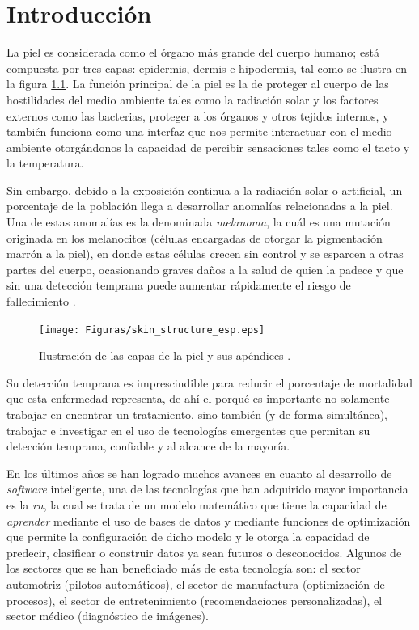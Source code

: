 
\doublespacing


\chapter{Introducción}

La piel es considerada como el órgano más grande del cuerpo humano; está compuesta por tres capas: epidermis, dermis e hipodermis, tal como se ilustra en la figura \ref{fig:skin1_jpg}. La función principal de la piel es la de proteger al cuerpo de las hostilidades del medio ambiente tales como la radiación solar y los factores externos como las bacterias, proteger a los órganos y otros tejidos internos, y también funciona como una interfaz que nos permite interactuar con el medio ambiente otorgándonos la capacidad de percibir sensaciones tales como el tacto y la temperatura.

Sin embargo, debido a la exposición continua a la radiación solar o artificial, un porcentaje de la población llega a desarrollar anomalías relacionadas a la piel. Una de estas anomalías es la denominada \emph{melanoma}, la cuál es una mutación originada en los melanocitos (células encargadas de otorgar la pigmentación marrón a la piel), en donde estas células crecen sin control y se esparcen a otras partes del cuerpo, ocasionando graves daños a la salud de quien la padece y que sin una detección temprana puede aumentar rápidamente el riesgo de fallecimiento \citep{cancer_org}.

\begin{figure}[b!]
    \texttt{[image: Figuras/skin\_structure\_esp.eps]}
    \centering
    \caption{Ilustración de las capas de la piel y sus apéndices \citep{skin_1}.}
    \label{fig:skin1_jpg}
\end{figure}

 Su detección temprana es imprescindible para reducir el porcentaje de mortalidad que esta enfermedad representa, de ahí el porqué es importante no solamente trabajar en encontrar un tratamiento, sino también (y de forma simultánea), trabajar e investigar en el uso de tecnologías emergentes que permitan su detección temprana, confiable y al alcance de la mayoría.

En los últimos años se han logrado muchos avances en cuanto al desarrollo de \emph{software} inteligente, una de las tecnologías que han adquirido mayor importancia es la \emph{\gls{rn}}, la cual se trata de un modelo matemático que tiene la capacidad de \emph{aprender} mediante el uso de bases de datos y mediante funciones de optimización que permite la configuración de dicho modelo y le otorga la capacidad de predecir, clasificar o construir datos ya sean futuros o desconocidos. Algunos de los sectores que se han beneficiado más de esta tecnología son: el sector automotriz (pilotos automáticos), el sector de manufactura (optimización de procesos), el sector de entretenimiento (recomendaciones personalizadas), el sector médico (diagnóstico de imágenes). 

